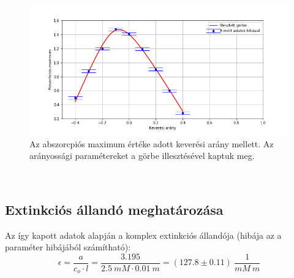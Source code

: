 \documentclass[20pt]{article}
\numberwithin{equation}{section}
\numberwithin{figure}{section}
\numberwithin{table}{section}
\begin{document}
	\begin{figure}[h!]
		\centering
		\includegraphics[width=.8\textwidth]{K.png}
		\caption[Másodfokú egyenlet megoldása]{Az abszorcpiós maximum értéke adott keverési arány mellett. Az arányossági paramétereket a görbe illesztésével kaptuk meg. \label{fig:maxes}}
	\end{figure}\\
	\subsection{Extinkciós állandó meghatározása}
	Az így kapott adatok alapján a komplex extinkciós állandója (hibája az a paraméter hibájából számítható):\\
	$$\epsilon=\frac{a}{c_{o}\cdot l}=\frac{3.195}{2.5\ mM\cdot0.01\ m}=(127.8\pm0.11)\ \frac{1}{mM\ m}$$
\end{document}
